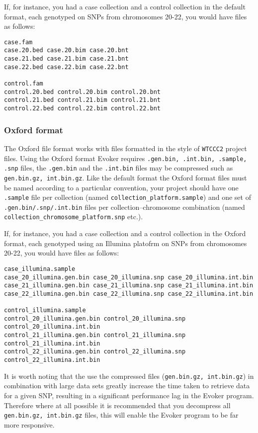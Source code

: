 \documentclass{article}
\begin{document}
If, for instance, you had a case collection and a control collection in the default format, each genotyped on SNPs from chromosomes 20-22, you would have files as follows:

\begin{verbatim}
case.fam
case.20.bed case.20.bim case.20.bnt 
case.21.bed case.21.bim case.21.bnt 
case.22.bed case.22.bim case.22.bnt 

control.fam
control.20.bed control.20.bim control.20.bnt
control.21.bed control.21.bim control.21.bnt
control.22.bed control.22.bim control.22.bnt
\end{verbatim}

\subsubsection{Oxford format}
The Oxford file format works with files formatted in the style of \texttt{WTCCC2} project files. Using the Oxford format Evoker requires \texttt{.gen.bin, .int.bin, .sample, .snp} files, the \texttt{.gen.bin} and the \texttt{.int.bin} files may be compressed such as \texttt{gen.bin.gz, int.bin.gz}. Like the default format the Oxford format files must be named according to a particular convention, your project should have one \texttt{.sample} file per collection (named \texttt{collection\_platform.sample}) and one set of \texttt{.gen.bin/.snp/.int.bin} files per collection--chromosome combination (named \texttt{collection\_chromosome\_platform.snp} etc.). 

If, for instance, you had a case collection and a control collection in the Oxford format, each genotyped using an Illumina platofrm on SNPs from chromosomes 20-22, you would have files as follows:

\begin{verbatim}
case_illumina.sample
case_20_illumina.gen.bin case_20_illumina.snp case_20_illumina.int.bin 
case_21_illumina.gen.bin case_21_illumina.snp case_21_illumina.int.bin 
case_22_illumina.gen.bin case_22_illumina.snp case_22_illumina.int.bin

control_illumina.sample
control_20_illumina.gen.bin control_20_illumina.snp control_20_illumina.int.bin 
control_21_illumina.gen.bin control_21_illumina.snp control_21_illumina.int.bin 
control_22_illumina.gen.bin control_22_illumina.snp control_22_illumina.int.bin
\end{verbatim}

It is worth noting that the use the compressed files (\texttt{gen.bin.gz, int.bin.gz}) in combination with large data sets greatly increase the time taken to retrieve data for a given SNP, resulting in a significant performance lag in the Evoker program. Therefore where at all possible it is recommended that you decompress all \texttt{gen.bin.gz, int.bin.gz} files, this will enable the Evoker program to be far more responsive.
\end{document}
